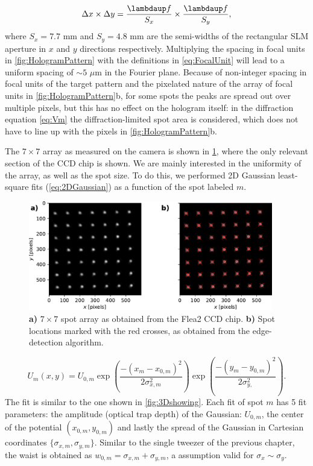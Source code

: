 \begin{equation}\label{eq:FocalUnit}
    \Delta x \times \Delta y = \frac{\lambdaup f}{S_x}\times \frac{\lambdaup f}{S_y},
\end{equation}
where $S_x = 7.7$ mm and $S_y = 4.8$ mm are the semi-widths of the rectangular SLM aperture in $x$ and $y$ directions respectively.
Multiplying the spacing in focal units in \cref{fig:HologramPattern} with the definitions in \cref{eq:FocalUnit} will lead to a uniform spacing of $\sim 5$ $\mu$m in the Fourier plane. 
Because of non-integer spacing in focal units of the target pattern and the pixelated nature of the array of focal units in \ref{fig:HologramPattern}b, for some spots the peaks are spread out over multiple pixels, but this has no effect on the hologram itself: in the diffraction equation \cref{eq:Vm} the diffraction-limited spot area is considered, which does not have to line up with the pixels in \cref{fig:HologramPattern}b.

The $7\times7$ array as measured on the camera is shown in \cref{fig:CameraLoG}, where the only relevant section of the CCD chip is shown. 
We are mainly interested in the uniformity of the array, as well as the spot size.
To do this, we performed 2D Gaussian least-square fits (\cref{eq:2DGaussian}) as a function of the spot labeled $m$.

\begin{figure}
    \centering
    \includegraphics[width=0.95\textwidth]{figures/CamImgLoGSpots.pdf}
    \caption{\textsf{\textbf{a)}} $7\times7$ spot array as obtained from the Flea2 CCD chip.
    \textsf{\textbf{b)}} Spot locations marked with the red crosses, as obtained from the edge-detection algorithm. }
    \label{fig:CameraLoG}
\end{figure}

\begin{equation}\label{eq:2DGaussianNumberK}
    U_m(x,y) = U_{0,m}\exp{\left(\frac{-(x_m-x_{0,m})^2}{2\sigma_{x,m}^2}\right)}
    \exp{\left( \frac{-(y_m-y_{0,m})^2}{2\sigma_{y,}^2} \right)}.
\end{equation}
The fit is similar to the one shown in \cref{fig:3Dshowing}.
Each fit of spot $m$ has 5 fit parameters: the amplitude (optical trap depth) of the Gaussian: $U_{0,m}$, the center of the potential $(x_{0,m}, y_{0,m})$ and lastly the spread of the Gaussian in Cartesian coordinates $\{\sigma_{x,m},\sigma_{y,m}\}$.
Similar to the single tweezer of the previous chapter, the waist is obtained as $w_{0,m} = \sigma_{x,m}+\sigma_{y,m}$, a assumption valid for $\sigma_x\sim\sigma_y$.

